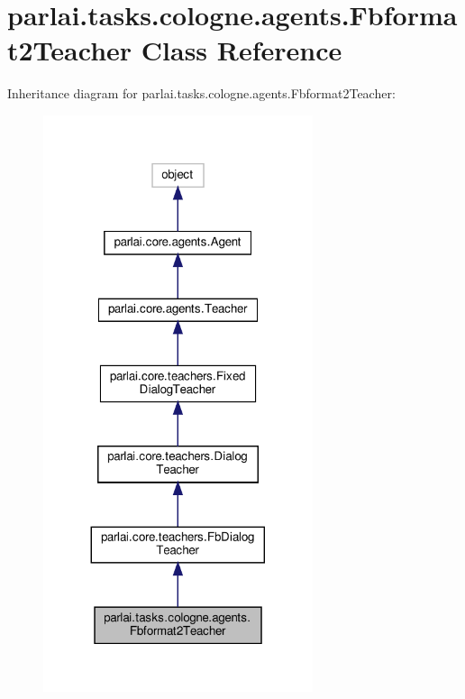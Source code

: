 \hypertarget{classparlai_1_1tasks_1_1cologne_1_1agents_1_1Fbformat2Teacher}{}\section{parlai.\+tasks.\+cologne.\+agents.\+Fbformat2\+Teacher Class Reference}
\label{classparlai_1_1tasks_1_1cologne_1_1agents_1_1Fbformat2Teacher}


Inheritance diagram for parlai.\+tasks.\+cologne.\+agents.\+Fbformat2\+Teacher\+:
\nopagebreak
\begin{figure}[H]
\begin{center}
\leavevmode
\includegraphics[width=224pt]{classparlai_1_1tasks_1_1cologne_1_1agents_1_1Fbformat2Teacher__inherit__graph}
\end{center}
\end{figure}


